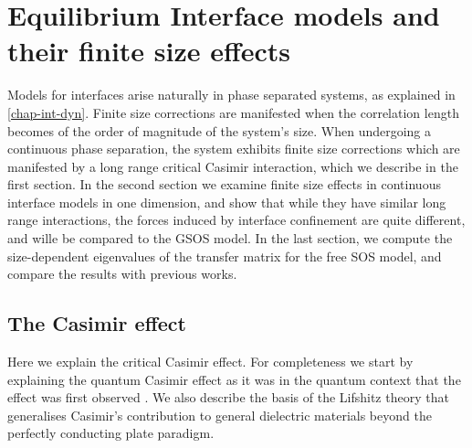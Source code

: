 \chapter{Equilibrium Interface models and their finite size effects}

Models for interfaces arise naturally in phase separated systems, as explained in \ref{chap-int-dyn}.  Finite size corrections are manifested when the correlation length becomes of the order of magnitude of the system's size. When undergoing a continuous phase separation, the system exhibits finite size corrections which are manifested by a long range critical Casimir interaction, which we describe in the first section. In the second section we examine finite size effects in continuous interface models in one dimension, and show that while they have similar long range interactions, the forces induced by interface confinement are quite different, and wille be compared to the GSOS model. In  the last section, we compute the size-dependent eigenvalues of the transfer matrix for the free SOS model, and compare the results with previous works.

    \section{The Casimir effect}
    \label{sec-casimir}
    
Here we explain the critical Casimir effect. For completeness we start by explaining the quantum Casimir effect as it was in the quantum context that the effect was first observed \cite{h_b_g_casimir_attraction_1948}.
We also describe the basis of the Lifshitz theory that generalises Casimir's contribution to 
general dielectric materials beyond the perfectly conducting plate paradigm.
    
